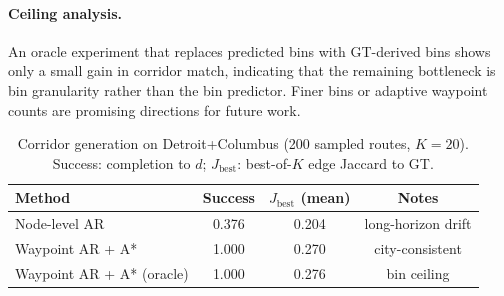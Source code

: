 \paragraph{Ceiling analysis.}
An oracle experiment that replaces predicted bins with GT-derived bins shows only a small gain in corridor match, indicating that the remaining bottleneck is bin granularity rather than the bin predictor.
Finer bins or adaptive waypoint counts are promising directions for future work.

\begin{table}[t]
  \caption{Corridor generation on Detroit+Columbus (200 sampled routes, $K=20$). Success: completion to $d$; $J_{\mathrm{best}}$: best-of-$K$ edge Jaccard to GT.}
  \label{tab:main-results}
  \vskip 0.1in
  \centering
  \small
  \begin{tabular}{lccc}
    \toprule
    Method & Success & $J_{\mathrm{best}}$ (mean) & Notes \\
    \midrule
    Node-level AR & 0.376 & 0.204 & long-horizon drift \\
    Waypoint AR + A* & 1.000 & 0.270 & city-consistent \\
    Waypoint AR + A* (oracle) & 1.000 & 0.276 & bin ceiling \\
    \bottomrule
  \end{tabular}
  \vskip -0.1in
\end{table}
